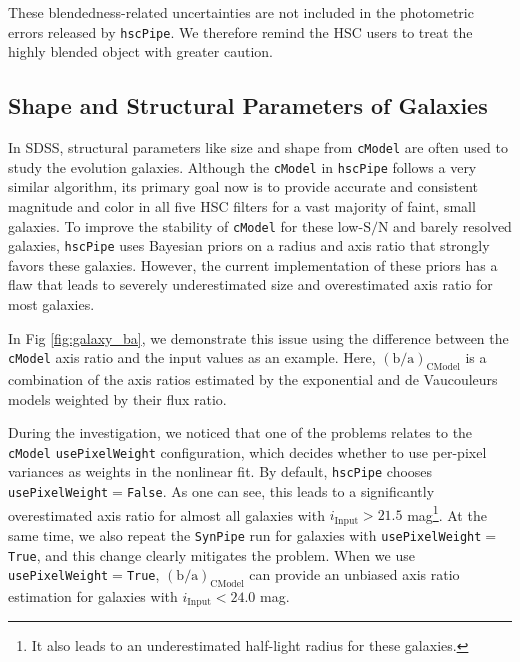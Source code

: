 \documentclass[useamsfonts]{pasj01}
\def\hscpipe{\texttt{hscPipe}}
\def\synpipe{\texttt{SynPipe}}
\def\cmodel{\texttt{cModel}}
\def\s2n{{$\mathrm{S}/\mathrm{N}$}}
\newcommand{\plan}[1]{\textcolor{blue} {\textbf{#1}}}
\begin{document}
    These blendedness-related uncertainties are not included in the photometric errors released by \hscpipe{}.
    We therefore remind the HSC users to treat the highly blended object with
    greater caution.




\subsection{Shape and Structural Parameters of Galaxies}
    \label{ssec:shape}

    In SDSS,  structural parameters like size and shape from \cmodel{} are often
    used to study the evolution galaxies.
    Although the \cmodel{} in \hscpipe{} follows a very similar algorithm, its primary
    goal now is to provide accurate and consistent magnitude and color in all five
    HSC filters for a vast majority of faint, small galaxies.
    To improve the stability of \cmodel{} for these low-\s2n{} and barely resolved
    galaxies, \hscpipe{} uses Bayesian priors on a radius and axis ratio that strongly
    favors these galaxies.
    However, the current implementation of these priors has a flaw that leads to
    severely underestimated size and overestimated axis ratio for most galaxies.

    In Fig \ref{fig:galaxy_ba}, we demonstrate this issue using the difference between
    the \cmodel{} axis ratio and the input values as an example.
    Here, $({\mathrm{b}/\mathrm{a}})_{\mathrm{CModel}}$ is a combination of the
    axis ratios estimated by the exponential and de Vaucouleurs models weighted by their flux ratio.

    During the investigation, we noticed that one of the problems relates to the \cmodel{} \texttt{usePixelWeight} configuration, which decides whether to
    use per-pixel variances as weights in the nonlinear fit.
    By default, \hscpipe{} chooses \texttt{usePixelWeight}$=$\texttt{False}.
    As one can see, this leads to a significantly overestimated axis ratio for almost
    all galaxies with $i_{\mathrm{Input}}>21.5$ mag\footnote{It also leads to an
    underestimated half-light radius for these galaxies.}.
    At the same time, we also repeat the \synpipe{} run for galaxies with
    \texttt{usePixelWeight}$=$\texttt{True}, and this change clearly mitigates
    the problem. When we use \texttt{usePixelWeight}$=$\texttt{True},
     $({\mathrm{b}/\mathrm{a}})_{\mathrm{CModel}}$ can provide an unbiased axis ratio estimation
    for galaxies with $i_{\mathrm{Input}}< 24.0$ mag.
\end{document}
